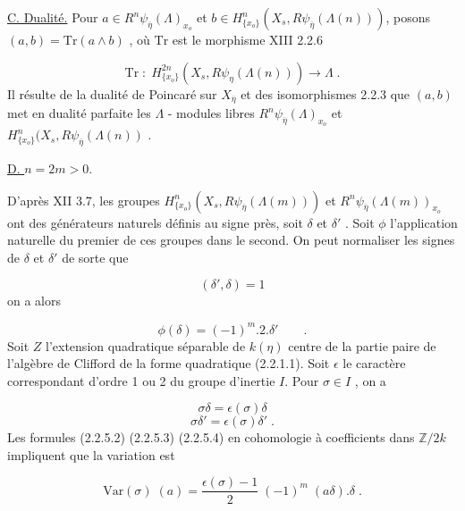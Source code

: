 \underline{C. Dualité.} Pour $a \in R^n\psi_{\overline{\eta}}(\Lambda)_{x_o}$ et $b \in H^n_{\{x_o\}}(X_s,R\psi_{\overline{\eta}}(\Lambda(n)))$, posons $(a,b) = \mathrm{Tr}(a \wedge b)$ , où $\mathrm{Tr}$ est le morphisme XIII 2.2.6

\begin{equation*}
\mathrm{Tr} \; : \; H^{2n}_{\{x_o\}}(X_s,R\psi_{\eta}(\Lambda(n))) \longrightarrow \Lambda \;.
\end{equation*}
Il résulte de la dualité de Poincaré sur $X_{\overline{\eta}}$ et des isomorphismes 2.2.3 que $(a,b)$ met en dualité parfaite les $\Lambda$ - modules libres $R^n\psi_{\overline{\eta}}(\Lambda)_{x_o}$ et $H^n_{\{x_o\}}(X_s,R\psi_{\overline{\eta}}(\Lambda(n))$ .


\underline{D. \quad $n = 2m > 0$}.

D'après XII 3.7, les groupes $H^n_{\{x_o\}}(X_s,R\psi_{\overline{\eta}}(\Lambda(m)))$ et $R^n\psi_{\overline{\eta}}(\Lambda(m))_{x_o}$ ont des générateurs naturels définis au signe près, soit $\delta$ et $\delta'$ . Soit $\phi$ l'application naturelle du premier de ces groupes dans le second. On peut normaliser les signes de $\delta$ et $\delta'$ de sorte que

\begin{equation}\tag{2.2.5.2}
(\delta',\delta) = 1
\end{equation}
on a alors

\begin{equation}\tag{2.2.5.3}
\phi(\delta) = (-1)^m . 2 . \delta' \qquad .
\end{equation}
Soit $Z$ l'extension quadratique séparable de $k(\eta)$ centre de la partie paire de l'algèbre de Clifford de la forme quadratique (2.2.1.1). Soit $\epsilon$ le caractère correspondant d'ordre 1 ou 2 du groupe d'inertie $I$. Pour $\sigma \in I$ , on a

\begin{equation}\tag{2.2.5.4}
\sigma\delta = \epsilon(\sigma)\delta
\end{equation}
\begin{equation}\tag{2.2.5.5}
\sigma\delta' = \epsilon(\sigma)\delta' \;.
\end{equation}
Les formules (2.2.5.2) (2.2.5.3) (2.2.5.4) en cohomologie à coefficients dans $\mathbb{Z}/2k$ impliquent que la variation est

\begin{equation}\tag{2.2.5.6}
\mathrm{Var}(\sigma) \; (a) = \frac{\epsilon(\sigma)-1}{2} \; (-1)^m \; (a\delta).\delta \;.
\end{equation}

